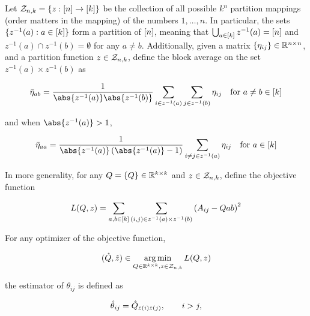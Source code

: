 \documentclass[11pt]{article}
\begin{document}
 Let $\mathcal{Z}_{n,k} = \{z : \lbrack n\rbrack \rightarrow \lbrack k\rbrack\}$ be the collection of all possible $k^n$ partition mappings (order matters in the mapping) of the numbers $1, \dots, n$. In particular, the sets $\{z^{-1}(a) : a \in \lbrack k\rbrack\}$ form a partition of $\lbrack n\rbrack$, meaning that $\bigcup_{a \in \lbrack k\rbrack} z^{-1}(a) = \lbrack n\rbrack$ and $z^{-1}(a) \cap z^{-1}(b) = \emptyset$ for any $a \neq b$. Additionally, given a matrix $\{\eta_{ij}\} \in \mathbb{R}^{n\times n}$, and a partition function $z \in \mathcal{Z}_{n,k}$, define the block average on the set $z^{-1}(a) \times z^{-1}(b)$ as

\begin{equation}
\begin{aligned}
\bar{\eta}_{ab} = \frac{1}{\abs{z^{-1}(a)}\abs{z^{-1}(b)}} \sum_{i \in z^{-1}(a)} \sum_{j \in z^{-1}(b)} \eta_{ij} \quad \text{for } a \neq b \in \brackets{k}
\end{aligned}
\end{equation}

and when $\abs{z^{-1}(a)} > 1$,

\begin{equation}
\begin{aligned}
\bar{\eta}_{aa} = \frac{1}{\abs{z^{-1}(a)}\left( \abs{z^{-1}(a)}-1 \right)} \sum_{i \neq j \in z^{-1}(a)}  \eta_{ij} \quad \text{for } a \in \brackets{k}
\end{aligned}
\end{equation}

In more generality, for any $Q = \{Q\}\in \mathbb{R}^{k\times k}$ and $z \in \mathcal{Z}_{n,k}$, define the objective function

\[ L(Q,z) = \sum_{a,b\in\lbrack k\rbrack} \sum_{(i,j)\in z^{-1}(a) \times z^{-1}(b)} \left( A_{ij} - Q{ab} \right)^2  \]

For any optimizer of the objective function,

\begin{equation}
\begin{aligned}
( \hat{Q}, \hat{z} ) \in \operatorname*{arg\,min}_{Q \in \mathbb{R}^{k \times k}, z \in \mathcal{Z}_{n,k}}  L(Q,z)
\end{aligned}
\end{equation}

the estimator of $\theta_{ij}$ is defined as

\begin{equation}
\begin{aligned}
\hat{\theta}_{ij} = \hat{Q}_{\hat{z}(i)\hat{z}(j)}, \qquad i > j,
\end{aligned}
\end{equation}
\end{document}
